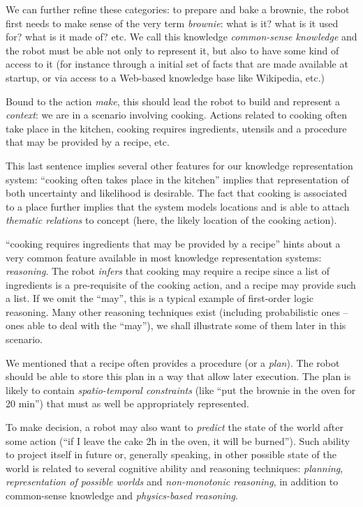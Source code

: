 We can further refine these categories: to prepare and bake a brownie, the
robot first needs to make sense of the very term \emph{brownie}: what is it?
what is it used for? what is it made of? etc. We call this knowledge
\emph{common-sense knowledge} and the robot must be able not only to represent
it, but also to have some kind of access to it (for instance through a initial
set of facts that are made available at startup, or via access to a Web-based
knowledge base like Wikipedia, etc.)

Bound to the action \emph{make}, this should lead the robot to build and
represent a \emph{context}: we are in a scenario involving cooking. Actions
related to cooking often take place in the kitchen, cooking requires ingredients, 
utensils and a procedure that may be provided by a recipe, etc.

This last sentence implies several other features for our knowledge
representation system: ``cooking often takes place in the kitchen'' implies
that representation of both uncertainty and likelihood is desirable. The fact
that cooking is associated to a place further implies that the system models
locations and is able to attach \emph{thematic relations} to concept
(here, the likely location of the cooking action).

``cooking requires ingredients that may be provided by a recipe'' hints about a
very common feature available in most knowledge representation systems:
\emph{reasoning}. The robot \emph{infers} that cooking may require a recipe
since a list of ingredients is a pre-requisite of the cooking action, and a
recipe may provide such a list. If we omit the ``may'', this is a typical
example of first-order logic reasoning. Many other reasoning techniques exist
(including probabilistic ones -- ones able to deal with the ``may''), we shall
illustrate some of them later in this scenario.

We mentioned that a recipe often provides a procedure (or a \emph{plan}). The robot
should be able to store this plan in a way that allow later execution.  The
plan is likely to contain \emph{spatio-temporal constraints} (like ``put
the brownie in the oven for 20 min'') that must as well be appropriately
represented.

To make decision, a robot may also want to \emph{predict} the state of the world
after some action (``if I leave the cake 2h in the oven, it will be burned'').
Such ability to project itself in future or, generally speaking, in other
possible state of the world is related to several cognitive ability and
reasoning techniques: \emph{planning}, \emph{representation of possible worlds}
and \emph{non-monotonic reasoning}, in addition to common-sense knowledge and
\emph{physics-based reasoning}.

